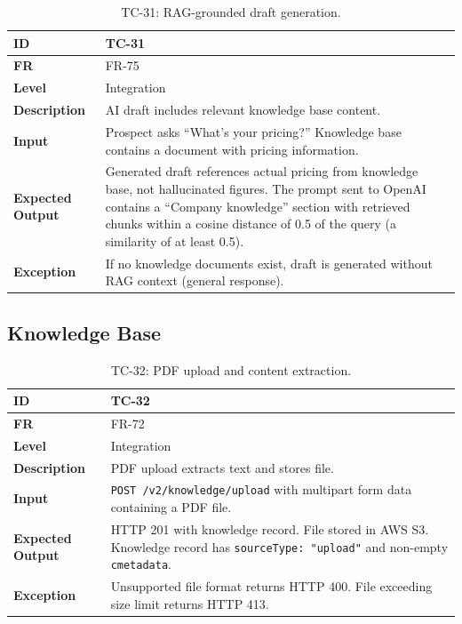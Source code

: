 \documentclass[a4paper]{article}
\begin{document}
\begin{table}[H]
\centering
\caption{TC-31: RAG-grounded draft generation.}
\small
\begin{tabular}{|p{3cm}|p{10.5cm}|}
\hline
\textbf{ID} & TC-31 \\
\hline
\textbf{FR} & FR-75 \\
\hline
\textbf{Level} & Integration \\
\hline
\textbf{Description} & AI draft includes relevant knowledge base content. \\
\hline
\textbf{Input} & Prospect asks ``What's your pricing?'' Knowledge base contains a document with pricing information. \\
\hline
\textbf{Expected Output} & Generated draft references actual pricing from knowledge base, not hallucinated figures. The prompt sent to OpenAI contains a ``Company knowledge'' section with retrieved chunks within a cosine distance of 0.5 of the query (a similarity of at least 0.5). \\
\hline
\textbf{Exception} & If no knowledge documents exist, draft is generated without RAG context (general response). \\
\hline
\end{tabular}
\end{table}

\subsection{Knowledge Base}

\begin{table}[H]
\centering
\caption{TC-32: PDF upload and content extraction.}
\small
\begin{tabular}{|p{3cm}|p{10.5cm}|}
\hline
\textbf{ID} & TC-32 \\
\hline
\textbf{FR} & FR-72 \\
\hline
\textbf{Level} & Integration \\
\hline
\textbf{Description} & PDF upload extracts text and stores file. \\
\hline
\textbf{Input} & \texttt{POST /v2/knowledge/upload} with multipart form data containing a PDF file. \\
\hline
\textbf{Expected Output} & HTTP 201 with knowledge record. File stored in AWS S3. Knowledge record has \texttt{sourceType: "upload"} and non-empty \texttt{cmetadata}. \\
\hline
\textbf{Exception} & Unsupported file format returns HTTP 400. File exceeding size limit returns HTTP 413. \\
\hline
\end{tabular}
\end{table}
\end{document}
